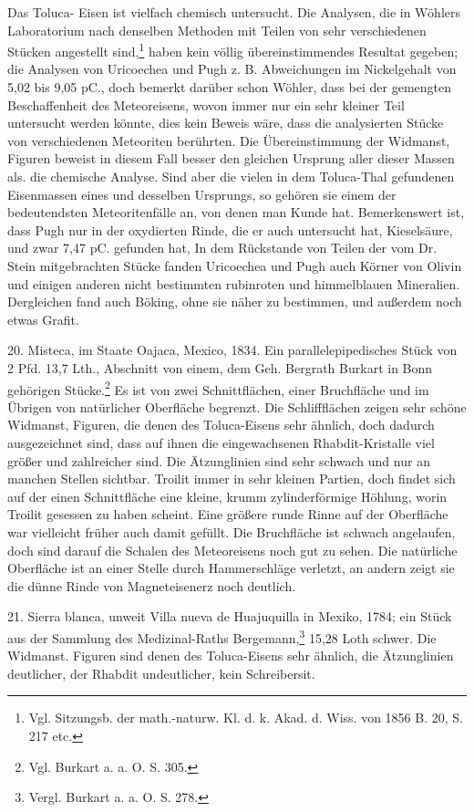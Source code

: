 \documentclass[a4paper, 11pt, oneside]{article}
\begin{document}
Das Toluca- Eisen ist vielfach chemisch untersucht. Die Analysen, die in Wöhlers Laboratorium nach denselben Methoden mit Teilen von sehr verschiedenen Stücken angestellt sind,\footnote{Vgl. Sitzungsb. der math.-naturw. Kl. d. k. Akad. d. Wiss. von 1856 B. 20, S. 217 etc.} haben kein völlig übereinstimmendes Resultat gegeben; die Analysen von Uricoechea und Pugh z. B. Abweichungen im Nickelgehalt von 5,02 bis 9,05 pC., doch bemerkt darüber schon Wöhler, dass bei der gemengten Beschaffenheit des Meteoreisens, wovon immer nur ein sehr kleiner Teil untersucht werden könnte, dies kein Beweis wäre, dass die analysierten Stücke von verschiedenen Meteoriten berührten. Die Übereinstimmung der Widmanst, Figuren beweist in diesem Fall besser den gleichen Ursprung aller dieser Massen als. die chemische Analyse. Sind aber die vielen in dem Toluca-Thal gefundenen Eisenmassen eines und desselben Ursprungs, so gehören sie einem der bedeutendsten Meteoritenfälle an, von denen man Kunde hat. Bemerkenswert ist, dass Pugh nur in der oxydierten Rinde, die er auch untersucht hat, Kieselsäure, und zwar 7,47 pC. gefunden hat, In dem Rückstande von Teilen der vom Dr. Stein mitgebrachten Stücke fanden Uricoechea und Pugh auch Körner von Olivin und einigen anderen nicht bestimmten rubinroten und himmelblauen Mineralien. Dergleichen fand auch Böking, ohne sie näher zu bestimmen, und außerdem noch etwas Grafit.

20. Misteca, im Staate Oajaca, Mexico, 1834. Ein parallelepipedisches Stück von 2 Pfd. 13,7 Lth., Abschnitt von einem, dem Geh. Bergrath Burkart in Bonn gehörigen Stücke.\footnote{Vgl. Burkart a. a. O. S. 305.} Es ist von zwei Schnittflächen, einer Bruchfläche und im Übrigen von natürlicher Oberfläche begrenzt. Die Schliffflächen zeigen sehr schöne Widmanst, Figuren, die denen des Toluca-Eisens sehr ähnlich, doch dadurch ausgezeichnet sind, dass auf ihnen die eingewachsenen Rhabdit-Kristalle viel größer und zahlreicher sind. Die Ätzunglinien sind sehr schwach und nur an manchen Stellen sichtbar. Troilit immer in sehr kleinen Partien, doch findet sich auf der einen Schnittfläche eine kleine, krumm zylinderförmige Höhlung, worin Troilit gesessen zu haben scheint. Eine größere runde Rinne auf der Oberfläche war vielleicht früher auch damit gefüllt. Die Bruchfläche ist schwach angelaufen, doch sind darauf die Schalen des Meteoreisens noch gut zu sehen. Die natürliche Oberfläche ist an einer Stelle durch Hammerschläge verletzt, an andern zeigt sie die dünne Rinde von Magneteisenerz noch deutlich.

21. Sierra blanca, unweit Villa nueva de Huajuquilla in Mexiko, 1784; ein Stück aus der Sammlung des Medizinal-Raths Bergemann,\footnote{Vergl. Burkart a. a. O. S. 278.} 15,28 Loth schwer. Die Widmanst. Figuren sind denen des Toluca-Eisens sehr ähnlich, die Ätzunglinien deutlicher, der Rhabdit undeutlicher, kein Schreibersit.
\end{document}
